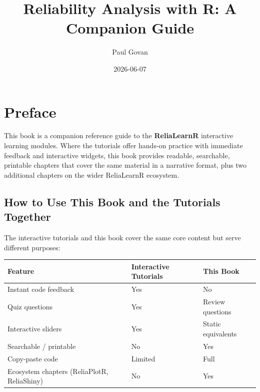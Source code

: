 \documentclass[
  letterpaper,
  DIV=11,
  numbers=noendperiod]{scrreprt}
\title{Reliability Analysis with R: A Companion Guide}
\author{Paul Govan}
\date{2026-06-07}
\newcounter{none} %
\renewcommand*\contentsname{Table of contents}
\newcommand\contentsname{Table of contents}
\begin{document}
\maketitle

\renewcommand*\contentsname{Table of contents}
{
\setcounter{tocdepth}{2}
\tableofcontents
}


\chapter*{Preface}\label{preface}


This book is a companion reference guide to the \textbf{ReliaLearnR}
interactive learning modules. Where the tutorials offer hands-on
practice with immediate feedback and interactive widgets, this book
provides readable, searchable, printable chapters that cover the same
material in a narrative format, plus two additional chapters on the
wider ReliaLearnR ecosystem.

\section*{How to Use This Book and the Tutorials
Together}\label{how-to-use-this-book-and-the-tutorials-together}


The interactive tutorials and this book cover the same core content but
serve different purposes:

{\def\LTcaptype{none} %
\begin{longtable}[]{@{}lll@{}}
\toprule\noalign{}
Feature & Interactive Tutorials & This Book \\
\midrule\noalign{}
\endhead
\bottomrule\noalign{}
\endlastfoot
Instant code feedback & Yes & No \\
Quiz questions & Yes & Review questions \\
Interactive sliders & Yes & Static equivalents \\
Searchable / printable & No & Yes \\
Copy-paste code & Limited & Full \\
Ecosystem chapters (ReliaPlotR, ReliaShiny) & No & Yes \\
\end{longtable}
}
\end{document}
